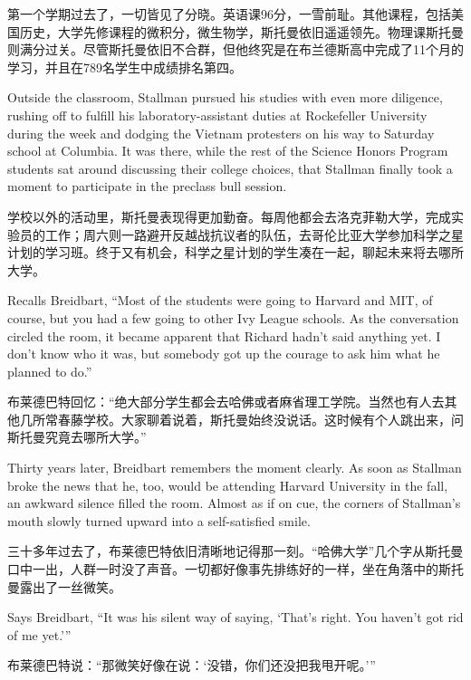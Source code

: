 \ifdefined\chs
第一个学期过去了，一切皆见了分晓。英语课96分，一雪前耻。其他课程，包括美国历史，大学先修课程的微积分，微生物学，斯托曼依旧遥遥领先。物理课斯托曼则满分过关。尽管斯托曼依旧不合群，但他终究是在布兰德斯高中完成了11个月的学习，并且在789名学生中成绩排名第四。
\fi

\ifdefined\eng
Outside the classroom, Stallman pursued his studies with even more diligence, rushing off to fulfill his laboratory-assistant duties at Rockefeller University during the week and dodging the Vietnam protesters on his way to Saturday school at Columbia. It was there, while the rest of the Science Honors Program students sat around discussing their college choices, that Stallman finally took a moment to participate in the preclass bull session.
\fi

\ifdefined\chs
学校以外的活动里，斯托曼表现得更加勤奋。每周他都会去洛克菲勒大学，完成实验员的工作；周六则一路避开反越战抗议者的队伍，去哥伦比亚大学参加科学之星计划的学习班。终于又有机会，科学之星计划的学生凑在一起，聊起未来将去哪所大学。
\fi

\ifdefined\eng
Recalls Breidbart, ``Most of the students were going to Harvard and MIT, of course, but you had a few going to other Ivy League schools. As the conversation circled the room, it became apparent that Richard hadn't said anything yet. I don't know who it was, but somebody got up the courage to ask him what he planned to do.''
\fi

\ifdefined\chs
布莱德巴特回忆：``绝大部分学生都会去哈佛或者麻省理工学院。当然也有人去其他几所常春藤学校。大家聊着说着，斯托曼始终没说话。这时候有个人跳出来，问斯托曼究竟去哪所大学。''
\fi

\ifdefined\eng
Thirty years later, Breidbart remembers the moment clearly. As soon as Stallman broke the news that he, too, would be attending Harvard University in the fall, an awkward silence filled the room. Almost as if on cue, the corners of Stallman's mouth slowly turned upward into a self-satisfied smile.
\fi

\ifdefined\chs
三十多年过去了，布莱德巴特依旧清晰地记得那一刻。``哈佛大学''几个字从斯托曼口中一出，人群一时没了声音。一切都好像事先排练好的一样，坐在角落中的斯托曼露出了一丝微笑。
\fi

\ifdefined\eng
Says Breidbart, ``It was his silent way of saying, `That's right. You haven't got rid of me yet.'\hspace{0.01in}''
\fi

\ifdefined\chs
布莱德巴特说：``那微笑好像在说：`没错，你们还没把我甩开呢。'\hspace{0.01in}''
\fi

\theendnotes
\setcounter{endnote}{0}
